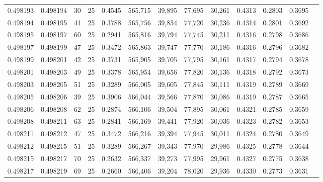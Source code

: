 \begin{tabular}{rrrrrrrrrrrrr}
0.498193 & 0.498194 &    30 &  25 &                                     0.4545 & 565,715 &  39,895 &  77,695 &  30,261 & 0.4313 & 0.2803 & 0.3695 \\
0.498194 & 0.498195 &    41 &  25 &                                     0.3788 & 565,756 &  39,854 &  77,720 &  30,236 & 0.4314 & 0.2801 & 0.3692 \\
0.498195 & 0.498197 &    60 &  25 &                                     0.2941 & 565,816 &  39,794 &  77,745 &  30,211 & 0.4316 & 0.2798 & 0.3686 \\
0.498197 & 0.498199 &    47 &  25 &                                     0.3472 & 565,863 &  39,747 &  77,770 &  30,186 & 0.4316 & 0.2796 & 0.3682 \\
0.498199 & 0.498201 &    42 &  25 &                                     0.3731 & 565,905 &  39,705 &  77,795 &  30,161 & 0.4317 & 0.2794 & 0.3678 \\
0.498201 & 0.498203 &    49 &  25 &                                     0.3378 & 565,954 &  39,656 &  77,820 &  30,136 & 0.4318 & 0.2792 & 0.3673 \\
0.498203 & 0.498205 &    51 &  25 &                                     0.3289 & 566,005 &  39,605 &  77,845 &  30,111 & 0.4319 & 0.2789 & 0.3669 \\
0.498205 & 0.498206 &    39 &  25 &                                     0.3906 & 566,044 &  39,566 &  77,870 &  30,086 & 0.4319 & 0.2787 & 0.3665 \\
0.498206 & 0.498208 &    62 &  25 &                                     0.2874 & 566,106 &  39,504 &  77,895 &  30,061 & 0.4321 & 0.2785 & 0.3659 \\
0.498208 & 0.498211 &    63 &  25 &                                     0.2841 & 566,169 &  39,441 &  77,920 &  30,036 & 0.4323 & 0.2782 & 0.3653 \\
0.498211 & 0.498212 &    47 &  25 &                                     0.3472 & 566,216 &  39,394 &  77,945 &  30,011 & 0.4324 & 0.2780 & 0.3649 \\
0.498212 & 0.498215 &    51 &  25 &                                     0.3289 & 566,267 &  39,343 &  77,970 &  29,986 & 0.4325 & 0.2778 & 0.3644 \\
0.498215 & 0.498217 &    70 &  25 &                                     0.2632 & 566,337 &  39,273 &  77,995 &  29,961 & 0.4327 & 0.2775 & 0.3638 \\
0.498217 & 0.498219 &    69 &  25 &                                     0.2660 & 566,406 &  39,204 &  78,020 &  29,936 & 0.4330 & 0.2773 & 0.3631 \\

\end{tabular}
